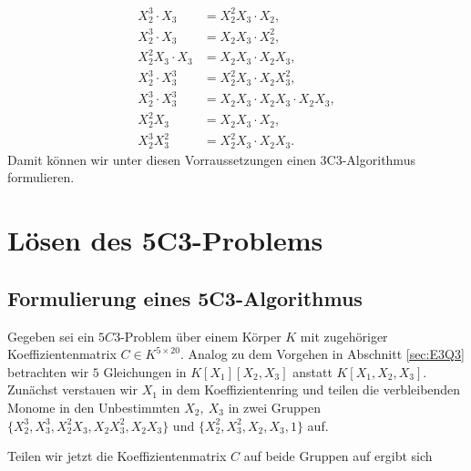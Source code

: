 \documentclass[a4paper,oneside, 11pt, openany%
]{article}
\theoremstyle{custom}
\theoremstyle{custom}
\begin{document}
	\begin{equation}
		\begin{alignedat}{1}
			X_{2}^{3}\cdot X_{3}	&=  X_{2}^{2}X_{3}\cdot X_{2}, \\
			X_{2}^{3}\cdot X_{3} &=  X_{2}X_{3}\cdot X_{2}^2, \\
			X_{2}^{2}X_{3} \cdot X_{3}	&= X_{2}X_{3} \cdot X_{2}X_{3}, \\
			X_{2}^{3}\cdot X_{3}^3 	&=  X_{2}^{2}X_{3}\cdot X_{2}X_{3}^2, \\
			X_{2}^{3}\cdot X_{3}^3	&=  X_{2}X_{3} \cdot X_{2}X_{3} \cdot X_{2}X_{3}, \\
			X_{2}^{2}X_{3} 	&=  X_{2}X_{3}\cdot X_{2}, \\
			X_{2}^{3}X_{3}^2 	&=  X_{2}^{2}X_{3}\cdot X_{2}X_{3}.
		\end{alignedat}
	\end{equation}
	Damit können wir unter diesen Vorraussetzungen einen 3C3-Algorithmus formulieren.
\newpage
\section{Lösen des 5C3-Problems}
\subsection{Formulierung eines 5C3-Algorithmus}\label{sec:5C3_alg}
Gegeben sei ein $5C3$-Problem über einem Körper $K$ mit zugehöriger Koeffizientenmatrix $C \in K^{5 \times 20}$.
Analog zu dem Vorgehen in Abschnitt \ref{sec:E3Q3} betrachten wir $5$ Gleichungen in $K\left[ X_{1}\right] \left[X_{2},X_{3}\right] $ anstatt $K\left[ X_{1},X_{2},X_{3}\right]$. Zunächst verstauen wir $X_{1}$ in dem Koeffizientenring und teilen die verbleibenden Monome in den Unbestimmten $X_{2},\ X_{3}$ in zwei Gruppen $\{X_{2}^3,X_{3}^3,X_{2}^2X_{3},X_{2}X_{3}^2,X_{2}X_{3}\}$ und $\{X_{2}^2,X_{3}^2,X_{2},X_{3},1\}$ auf.

Teilen wir jetzt die Koeffizientenmatrix $C$ auf beide Gruppen auf ergibt sich 
\end{document}
